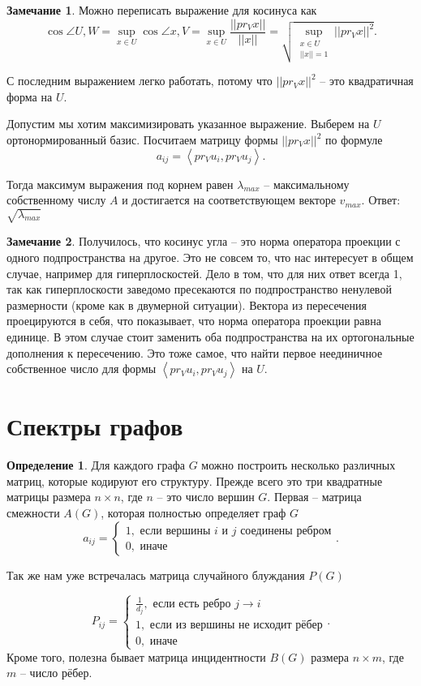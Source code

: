 \documentclass[10pt,a4paper,oneside]{book}
\theoremstyle{definition}
\newtheorem*{rem}{Замечание}
\newtheorem*{defn}{{\color{yellow!30!red} Определение}}
\def\lan{\left\langle }
\def\ran{\right\rangle}
\def\dfn{\begin{defn}}
\def\edfn{\end{defn}}
\def\rm{\begin{rem}}
\def\erm{\end{rem}}
\begin{document}
\rm Можно переписать выражение для косинуса как $$\cos \angle U,W= \sup_{ x\in U} \cos \angle x, V = \sup_{x\in U} \frac{||pr_V x||}{||x||}= \sqrt{ \sup_{\substack{x\in U\\ ||x||=1}} ||pr_V x||^2} .$$
\erm

С последним выражением легко работать, потому что $||pr_V x||^2$ -- это квадратичная форма на $U$.

Допустим мы хотим максимизировать указанное выражение. Выберем на $U$ ортонормированный базис. Посчитаем матрицу формы $||pr_V x||^2$ по формуле 
$$a_{ij}= \lan pr_V u_i, pr_V u_j\ran.$$

Тогда максимум выражения под корнем равен $\lambda_{max}$ -- максимальному собственному числу $A$ и достигается на соответствующем векторе $v_{max}$. Ответ: $\sqrt{\lambda_{max}}$

\rm Получилось, что косинус угла -- это норма оператора проекции с одного подпространства на другое. Это не совсем то, что нас интересует в общем случае, например для гиперплоскостей. Дело в том, что для них ответ всегда 1, так как гиперплоскости заведомо пресекаются по подпространство ненулевой размерности (кроме как в двумерной ситуации). Вектора из пересечения проецируются в себя, что показывает, что норма оператора проекции равна единице. В этом случае стоит заменить оба подпространства на их ортогональные дополнения к пересечению. Это тоже самое, что найти первое неединичное собственное число для формы  $\lan pr_V u_i, pr_V u_j\ran$ на $U$.
\erm




\section{Спектры графов}

\dfn
Для каждого графа $G$ можно построить  несколько  различных матриц, которые кодируют его структуру. Прежде всего это три квадратные матрицы  размера $n\times n$, где $n$ -- это число вершин $G$. 
Первая -- матрица смежности  $A(G)$, которая полностью определяет граф $G$
$$a_{ij}=\begin{cases} 1, \text{ если вершины $i$ и $j$ соединены ребром}\\
0, \text{ иначе }
\end{cases}.$$

Так же нам уже встречалась матрица случайного блуждания  $P(G)$

$$P_{ij}=\begin{cases}
\frac{1}{d_j}, \text{ если есть ребро $j\to i$}\\
1, \text{ если из вершины не исходит рёбер} \\
0, \text{ иначе }
\end{cases}.$$
Кроме того, полезна бывает матрица инцидентности $B(G)$ размера $n\times m$, где $m$ -- число рёбер.
\edfn
\end{document}
